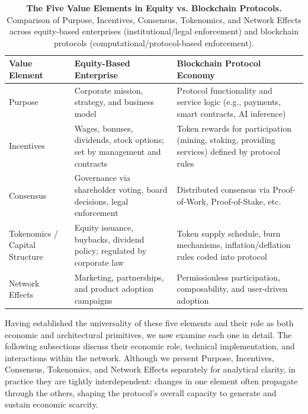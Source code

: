 \documentclass[12pt]{article}
\begin{document}
\begin{table}[H]
\centering
\caption{\textbf{The Five Value Elements in Equity vs. Blockchain Protocols.} 
Comparison of Purpose, Incentives, Consensus, Tokenomics, and Network Effects across 
equity-based enterprises (institutional/legal enforcement) and blockchain protocols 
(computational/protocol-based enforcement).}

\label{tab:five_elements_stock_vs_token_main}
\renewcommand{\arraystretch}{1.4}
\begin{tabular}{@{}L{3.5cm}L{6cm}L{6cm}@{}}
\toprule
{}
\textbf{Value Element} & \textbf{Equity-Based Enterprise} & \textbf{Blockchain Protocol Economy} \\
\midrule
Purpose & Corporate mission, strategy, and business model & Protocol functionality and service logic (e.g., payments, smart contracts, AI inference) \\
Incentives & Wages, bonuses, dividends, stock options; set by management and contracts & Token rewards for participation (mining, staking, providing services) defined by protocol rules \\
Consensus & Governance via shareholder voting, board decisions, legal enforcement & Distributed consensus via Proof-of-Work, Proof-of-Stake, etc. \\
Tokenomics / Capital Structure & Equity issuance, buybacks, dividend policy; regulated by corporate law & Token supply schedule, burn mechanisms, inflation/deflation rules coded into protocol \\
Network Effects & Marketing, partnerships, and product adoption campaigns & Permissionless participation, composability, and user-driven adoption \\
\bottomrule
\end{tabular}
\end{table}

Having established the universality of these five elements and their role as both economic and architectural primitives, we now examine each one in detail. The following subsections discuss their economic role, technical implementation, and interactions within the network. Although we present Purpose, Incentives, Consensus, Tokenomics, and Network Effects separately for analytical clarity, in practice they are tightly interdependent: changes in one element often propagate through the others, shaping the protocol’s overall capacity to generate and sustain economic scarcity.

\end{document}

